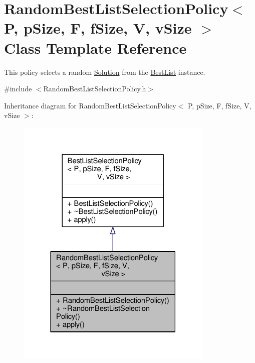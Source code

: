 \hypertarget{classRandomBestListSelectionPolicy}{}\section{Random\+Best\+List\+Selection\+Policy$<$ P, p\+Size, F, f\+Size, V, v\+Size $>$ Class Template Reference}
\label{classRandomBestListSelectionPolicy}


This policy selects a random \hyperlink{classSolution}{Solution} from the \hyperlink{classBestList}{Best\+List} instance.  




{\ttfamily \#include $<$Random\+Best\+List\+Selection\+Policy.\+h$>$}



Inheritance diagram for Random\+Best\+List\+Selection\+Policy$<$ P, p\+Size, F, f\+Size, V, v\+Size $>$\+:
\nopagebreak
\begin{figure}[H]
\begin{center}
\leavevmode
\includegraphics[width=266pt]{classRandomBestListSelectionPolicy__inherit__graph}
\end{center}
\end{figure}


